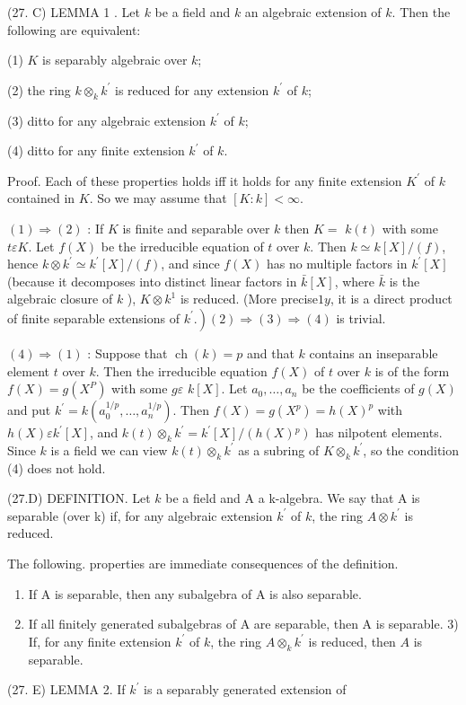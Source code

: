 (27. C) LEMMA 1 . Let $k$ be a field and $k$ an algebraic extension of $k$. Then the following are equivalent:

(1) $K$ is separably algebraic over $k$;

(2) the ring $k \otimes_{k} k^{\prime}$ is reduced for any extension $k^{\prime}$ of $k$;

(3) ditto for any algebraic extension $k^{\prime}$ of $k$;

(4) ditto for any finite extension $k^{\prime}$ of $k$.

Proof. Each of these properties holds iff it holds for any finite extension $K^{\prime}$ of $k$ contained in $K$. So we may assume that $[K: k]<\infty$.

$(1) \Rightarrow(2)$ : If $K$ is finite and separable over $k$ then $K=$ $k(t)$ with some $t \varepsilon K$. Let $f(X)$ be the irreducible equation of $t$ over $k$. Then $k \simeq k[X] /(f)$, hence $k \otimes k^{\prime} \simeq k^{\prime}[X] /(f)$, and since $f(X)$ has no multiple factors in $k^{\prime}[X]$ (because it decomposes into distinct linear factors in $\bar{k}[X]$, where $\bar{k}$ is the algebraic closure of $k$ ), $K \otimes k^{1}$ is reduced. (More precise$1 y$, it is a direct product of finite separable extensions of $\left.k^{\prime} .\right)(2) \Rightarrow(3) \Rightarrow(4)$ is trivial.

$(4) \Rightarrow(1)$ : Suppose that $\operatorname{ch}(k)=p$ and that $k$ contains an inseparable element $t$ over $k$. Then the irreducible equation $f(X)$ of $t$ over $k$ is of the form $f(X)=g\left(X^{P}\right)$ with some $g \varepsilon$ $k[X]$. Let $a_{0}, \ldots, a_{n}$ be the coefficients of $g(X)$ and put $k^{\prime}=k\left(a_{0}^{1 / p}, \ldots, a_{n}^{1 / p}\right)$. Then $f(X)=g\left(X^{p}\right)=h(X)^{p}$ with $h(X) \varepsilon k^{\prime}[X]$, and $k(t) \otimes_{k} k^{\prime}=k^{\prime}[X] /\left(h(X){ }^{p}\right)$ has nilpotent elements. Since $k$ is a field we can view $k(t) \otimes_{k} k^{\prime}$ as a subring of $K \otimes_{k} k^{\prime}$, so the condition (4) does not hold.

(27.D) DEFINITION. Let $k$ be a field and A a k-algebra. We say that A is separable (over k) if, for any algebraic extension $k^{\prime}$ of $k$, the ring $A \otimes k^{\prime}$ is reduced.

The following. properties are immediate consequences of the definition.

\begin{enumerate}
  \item If A is separable, then any subalgebra of A is also separable.

  \item If all finitely generated subalgebras of A are separable, then A is separable. 3) If, for any finite extension $k^{\prime}$ of $k$, the ring $A \otimes_{k} k^{\prime}$ is reduced, then $A$ is separable.

\end{enumerate}
(27. E) LEMMA 2. If $k^{\prime}$ is a separably generated extension of

